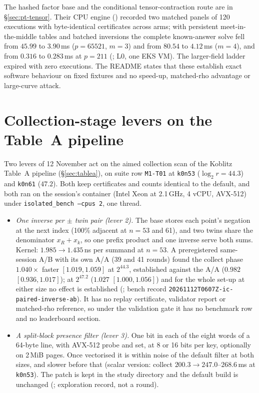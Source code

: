 The hashed factor base and the conditional tensor-contraction route are in
\S\ref{sec:pt-tensor}. Their CPU engine ()
recorded two matched panels of 120 executions with byte-identical
certificates across arms; with persistent meet-in-the-middle tables and
batched inversions the complete known-answer solve fell from $45.99$ to
$3.90$\,ms ($p=65521$, $m=3$) and from $80.54$ to $4.12$\,ms ($m=4$), and from
$0.316$ to $0.283$\,ms at $p=211$ (;
L0, one EKS VM). The larger-field ladder expired with zero executions. The
README states that these establish exact software behaviour on fixed
fixtures and no speed-up, matched-rho advantage or large-curve attack.

\section{Collection-stage levers on the Table~A pipeline}\label{sec:in-levers}

Two levers of 12 November act on the aimed collection scan of the Koblitz
Table~A pipeline (\S\ref{sec:tablea}), on suite row \texttt{M1-T01} at
\texttt{k0n53} ($\log_2r=44.3$) and \texttt{k0n61} ($47.2$). Both keep
certificates and counts identical to the default, and both ran on the
session's container (Intel Xeon at 2.1\,GHz, 4 vCPU, AVX-512) under
\texttt{isolated\_bench --cpus 2}, one thread.
\begin{itemize}
\item \emph{One inverse per $\pm$ twin pair (lever 2).} The base stores each
  point's negation at the next index (100\% adjacent at $n=53$ and 61), and
  two twins share the denominator $x_R+x_k$, so one prefix product and one
  inverse serve both sums. Kernel: $1.985\to1.435$\,ns per summand at
  $n=53$. A preregistered same-session A/B with its own A/A (39 and 41
  rounds) found the collect phase $1.040\times$ faster $[1.019,1.059]$ at
  $2^{44.3}$, established against the A/A ($0.982$ $[0.936,1.017]$); at
  $2^{47.2}$ ($1.027$ $[1.000,1.056]$) and for the whole set-up at either
  size no effect is established
  (;
  bench record \texttt{20261112T0607Z-ic-paired-inverse-ab}). It has no
  replay certificate, validator report or matched-rho reference, so under
  the validation gate it has no benchmark row and no leaderboard section.
\item \emph{A split-block presence filter (lever 3).} One bit in each of the
  eight words of a 64-byte line, with AVX-512 probe and set, at 8 or 16 bits
  per key, optionally on 2\,MiB pages. Once vectorised it is within noise of
  the default filter at both sizes, and slower before that (scalar
  version: collect $200.3\to247.0$--$268.6$\,ms at \texttt{k0n53}). The patch
  is kept in the study directory and the default build is unchanged
  (;
  exploration record, not a round).
\end{itemize}

